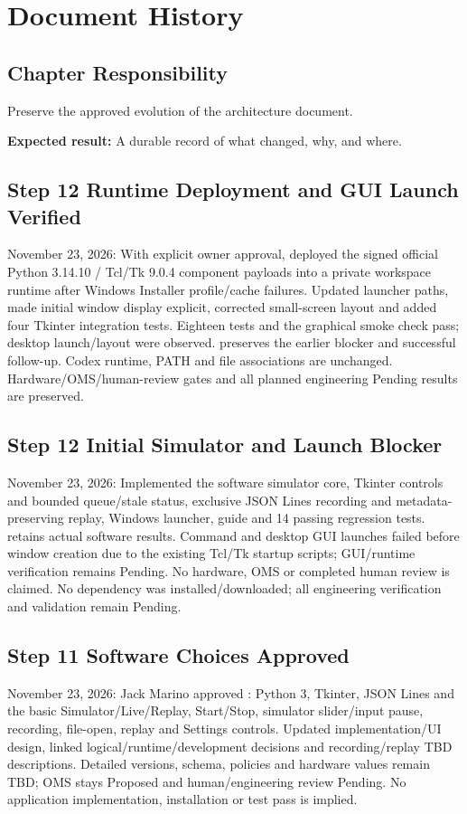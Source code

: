 \chapter{Document History}
\section{Chapter Responsibility}
\label{Section:DocumentHistoryResponsibility}
Preserve the approved evolution of the architecture document.

\noindent\textbf{Expected result:} A durable record of what changed, why, and where.

\section{Step 12 Runtime Deployment and GUI Launch Verified}
November 23, 2026: With explicit owner approval, deployed the signed official Python 3.14.10 / Tcl/Tk 9.0.4 component payloads into a private workspace runtime after Windows Installer profile/cache failures. Updated launcher paths, made initial window display explicit, corrected small-screen layout and added four Tkinter integration tests. Eighteen tests and the graphical smoke check pass; desktop launch/layout were observed.  preserves the earlier blocker and successful follow-up. Codex runtime, PATH and file associations are unchanged. Hardware/OMS/human-review gates and all planned engineering Pending results are preserved.

\section{Step 12 Initial Simulator and Launch Blocker}
November 23, 2026: Implemented the software simulator core, Tkinter controls and bounded queue/stale status, exclusive JSON Lines recording and metadata-preserving replay, Windows launcher, guide and 14 passing regression tests.  retains actual software results. Command and desktop GUI launches failed before window creation due to the existing Tcl/Tk startup scripts; GUI/runtime verification remains Pending. No hardware, OMS or completed human review is claimed. No dependency was installed/downloaded; all engineering verification and validation remain Pending.

\section{Step 11 Software Choices Approved}
November 23, 2026: Jack Marino approved : Python 3, Tkinter, JSON Lines and the basic Simulator/Live/Replay, Start/Stop, simulator slider/input pause, recording, file-open, replay and Settings controls. Updated implementation/UI design, linked logical/runtime/development decisions and recording/replay TBD descriptions. Detailed versions, schema, policies and hardware values remain TBD; OMS stays Proposed and human/engineering review Pending. No application implementation, installation or test pass is implied.

